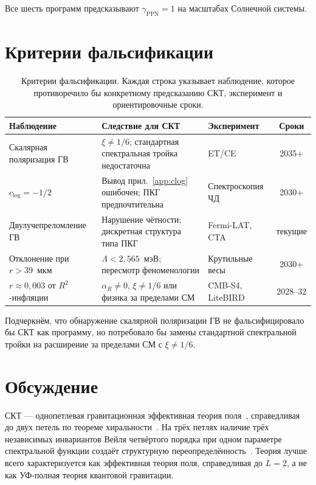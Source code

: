 \documentclass[12pt,a4paper]{article}
\theoremstyle{plain}
\theoremstyle{definition}
\theoremstyle{remark}
\begin{document}
Все шесть программ предсказывают $\gamma_{\mathrm{PPN}} = 1$ на
масштабах Солнечной системы.

\section{Критерии фальсификации}
\label{sec:falsification}

\begin{table}[ht]
\centering
\caption{Критерии фальсификации. Каждая строка указывает
наблюдение, которое противоречило бы конкретному предсказанию СКТ,
эксперимент и ориентировочные сроки.}
\label{tab:falsification}
\footnotesize
\setlength{\tabcolsep}{4pt}
\begin{tabular}{p{3.0cm}p{4.5cm}p{2.2cm}c}
\toprule
Наблюдение & Следствие для СКТ & Эксперимент & Сроки \\
\midrule
Скалярная поляризация ГВ &
  $\xi \neq 1/6$; стандартная спектральная тройка недостаточна &
  ET/CE & 2035+ \\[4pt]
$c_{\log} = -1/2$ &
  Вывод прил.~\ref{app:clog} ошибочен; ПКГ предпочтительна &
  Спектроскопия ЧД & 2030+ \\[4pt]
Двулучепреломление ГВ &
  Нарушение чётности; дискретная структура типа ПКГ &
  Fermi-LAT, CTA & текущие \\[4pt]
Отклонение при $r > 39$~мкм &
  $\Lambda < 2{,}565$~мэВ; пересмотр феноменологии &
  Крутильные весы & 2030+ \\[4pt]
$r \approx 0{,}003$ от $R^2$-инфляции &
  $\alpha_R \neq 0$, $\xi \neq 1/6$ или физика за пределами СМ &
  CMB-S4, LiteBIRD & 2028--32 \\
\bottomrule
\end{tabular}
\normalsize
\end{table}

Подчеркнём, что обнаружение скалярной поляризации ГВ не
фальсифицировало бы СКТ как программу, но потребовало бы замены
стандартной спектральной тройки на расширение за пределами СМ с $\xi \neq 1/6$.

\section{Обсуждение}
\label{sec:discussion}

СКТ --- однопетлевая гравитационная эффективная теория
поля~\cite{Donoghue:1994}, справедливая до двух петель по теореме
хиральности~\cite{Alfyorov:2026paper3}. На трёх петлях наличие
трёх независимых инвариантов Вейля четвёртого порядка при одном параметре
спектральной функции создаёт структурную
переопределённость~\cite{Alfyorov:2026paper3}. Теория лучше всего
характеризуется как эффективная теория поля, справедливая до $L = 2$, а не как
УФ-полная теория квантовой гравитации.
\end{document}

